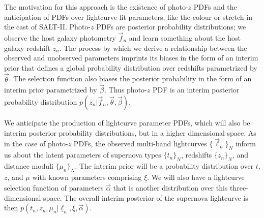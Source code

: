 \documentclass[12pt, twocolumn]{emulateapj}
\newcommand{\textul}{\underline}
\begin{document}
The motivation for this approach is the existence of photo-$z$ PDFs and the anticipation of PDFs over lightcurve fit parameters, like the colour or stretch in the cast of SALT-II.  
Photo-$z$ PDFs are posterior probability distributions; we observe the host galaxy photometry $\vec{f}_{n}$ and learn something about the host galaxy redshift $z_{n}$.  
The process by which we derive a relationship between the observed and unobserved parameters imprints its biases in the form of an interim prior that defines a global probability distribution over redshifts parametrized by $\vec{\theta}$.  
The selection function also biases the posterior probability in the form of an interim prior parametrized by $\vec{\beta}$.  
Thus photo-$z$ PDF is an interim posterior probability distribution $p(z_{n} | \vec{f}_{n}, \vec{\theta}, \vec{\beta})$.

We anticipate the production of lightcurve parameter PDFs, which will also be interim posterior probability distributions, but in a higher dimensional space.  
As in the case of photo-$z$ PDFs, the observed multi-band lightcurves $\{\vec{\ell}_{n}\}_{N}$ inform us about the latent parameters of supernova types $\{t_{n}\}_{N}$, redshifts $\{z_{n}\}_{N}$, and distance moduli $\{\mu_{n}\}_{N}$.  
The interim prior will be a probability distribution over $t$, $z$, and $\mu$ with known parameters comprising $\textul{\xi}$.  
We will also have a lightcurve selection function of parameters $\vec{\alpha}$ that is another distribution over this three-dimensional space.  
The overall interim posterior of the supernova lightcurve is then $p(t_{n}, z_{n}, \mu_{n} | \textul{\ell}_{n}, \textul{\xi}, \vec{\alpha})$.
\end{document}
